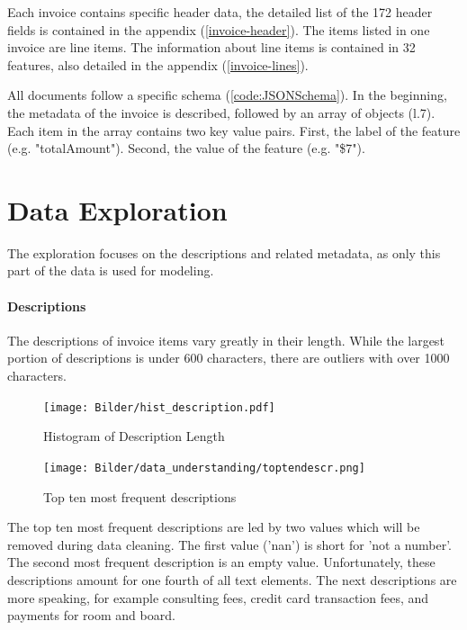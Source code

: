 Each invoice contains specific header data, the detailed list of the 172 header fields is contained in the appendix (\ref{invoice-header}). 
The items listed in one invoice are line items. The information about line items is contained in 32 features, also detailed in the appendix (\ref{invoice-lines}).

All documents follow a specific schema (\ref{code:JSONSchema}). In the beginning, the metadata of the invoice is described, followed by an array of objects (l.7). Each item in the array contains two key value pairs. First, the label of the feature (e.g. "totalAmount"). Second, the value of the feature (e.g. "\$7").






\section{Data Exploration}
The exploration focuses on the descriptions and related metadata, as only this part of the data is used for modeling.
\paragraph{Descriptions}
The descriptions of invoice items vary greatly in their length. While the largest portion of descriptions is under 600 characters, there are outliers with over 1000 characters. 
\begin{figure}[h!]
	\centering
	\texttt{[image: Bilder/hist\_description.pdf]}
	\caption{Histogram of Description Length}
	\label{fig:languages-bar}
\end{figure}

\begin{figure}[!h]
	\centering
	\texttt{[image: Bilder/data\_understanding/toptendescr.png]}
	\caption{Top ten most frequent descriptions}
	\label{fig:descr-most-frequent}
\end{figure}
The top ten most frequent descriptions are led by two values which will be removed during data cleaning. The first value ('nan') is short for 'not a number'. The second most frequent description is an empty value. Unfortunately, these descriptions amount for one fourth of all text elements. The next descriptions are more speaking, for example consulting fees, credit card transaction fees, and payments for room and board.

